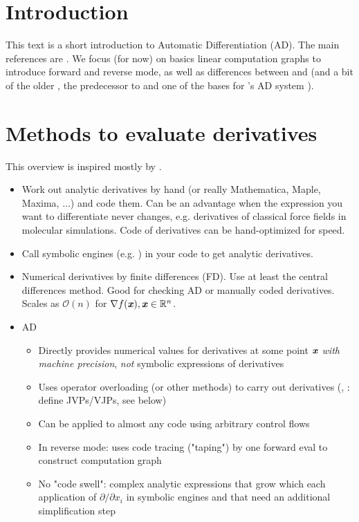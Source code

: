 \documentclass[paper=a4,11pt,headsepline]{scrartcl}
\begin{document}
\tableofcontents
\newpage

\section{Introduction}

This text is a short introduction to Automatic Differentiation (AD). The main
references are \cite{baydin_2018, johnson_2017, jax_autodiff_cookbook}. We
focus (for now) on basics linear computation graphs to introduce forward and
reverse mode, as well as differences between \jax and \pytorch (and a bit of
the older \autograd, the predecessor to \jax and one of the bases for
\pytorch's AD system \cite{paszke_2017}).

\section{Methods to evaluate derivatives}

This overview is inspired mostly by \cite{baydin_2018}.

\begin{itemize}
    \item Work out analytic derivatives by hand (or really Mathematica, Maple, Maxima, ...)
        and code them. Can be an advantage when the expression you want to
        differentiate never changes, e.g. derivatives of classical force
        fields in molecular simulations. Code of derivatives can be
        hand-optimized for speed.
    \item Call symbolic engines (e.g. ) in your code to get
        analytic derivatives.
    \item Numerical derivatives by finite differences (FD). Use at least
        the central differences method. Good for checking AD or manually coded
        derivatives. Scales as $\mathcal O(n)$ for $\nabla f(\bm{\mathit{x}}), \bm{\mathit{x}}\in\mathbb R^n$.
    \item AD
        \begin{itemize}
            \item Directly provides numerical values for derivatives at some point
                $\bm{\mathit{x}}$ \emph{with machine precision}, \emph{not} symbolic expressions of
                derivatives
            \item Uses operator overloading (or other methods) to carry out
                derivatives (\jax, \pytorch: define JVPs/VJPs, see below)
            \item Can be applied to almost any code using arbitrary control flows
            \item In reverse mode: uses code tracing ("taping") by one forward eval
                to construct computation graph
            \item No "code swell": complex analytic expressions that grow which each
                application of $\partial/\partial x_i$ in symbolic engines and that
                need an additional simplification step
        \end{itemize}
\end{itemize}
\end{document}
